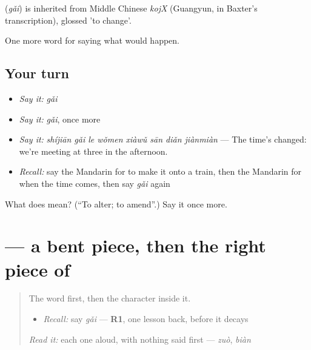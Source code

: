 \begin{cousinweb}
\textbf{} (\emph{gǎi}) is inherited from Middle Chinese \emph{kojX} (Guangyun, in Baxter's transcription), glossed 'to change'.
\end{cousinweb}

\begin{grammarlens}[title={What you've built}]
One more word for saying what would happen.
\end{grammarlens}

\subsection*{Your turn}
\begin{itemize}
\raggedright
  \item \emph{Say it:} \emph{gǎi}
  \item \emph{Say it:} \emph{gǎi}, once more
  \item \emph{Say it:} \emph{shíjiān gǎi le wǒmen xiàwǔ sān diǎn jiànmiàn} — The time's changed: we're meeting at three in the afternoon.
  \item \emph{Recall:} say the Mandarin for to make it onto a train, then the Mandarin for when the time comes, then say \emph{gǎi} again
\end{itemize}

\begin{tcolorbox}[breakable,colback=teal!4,colframe=teal!35!black,title={Before you move on}]
What does  mean? (\textquotedblleft{}To alter; to amend\textquotedblright{}.) Say it once more.
\end{tcolorbox}
\section[\texorpdfstring{\zh{改} (gǎi)}{改 (gǎi)}]{ — a bent piece, then the right piece of }

\label{lesson:ZH-W392-gai-alter}



\begin{quote}
The word first, then the character inside it.

\begin{itemize}
\raggedright
  \item \emph{Recall:} say \emph{gǎi} — \textbf{R1}, one lesson back, before it decays
\end{itemize}

\begin{quote}
 
\end{quote}

\emph{Read it:} each one aloud, with nothing said first — \emph{zuò}, \emph{biàn}
\end{quote}

